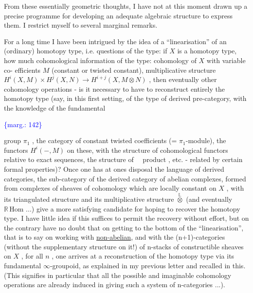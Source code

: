 \documentclass[11pt]{article}
\newcommand{\scanpage}[1]{\par\bigskip\noindent{\small\sffamily[scan #1]}\par}
\newcommand{\mspage}[1]{{\small\sffamily[p.\,#1]}}
\newcommand{\margin}[1]{\textcolor{blue}{\{\textsf{marg.:} #1\}}}
\newcommand{\uline}[1]{\underline{#1}}
\begin{document}
From these essentially geometric thoughts, I have not at
this moment drawn up a precise programme for developing an
adequate algebraic structure to express them.  I restrict myself
to several marginal remarks.

For a long time I  have been intrigued by the idea of a
``linearisation'' of an (ordinary) homotopy type, i.e. questions of
the type: if  $X$  is a homotopy type, how much cohomological
information of the type: cohomology of  $X$  with variable co-%
efficients  $M$ (constant or twisted constant), multiplicative
structure  $H^{i}(X, M) \times H^{j}(X, N) \to H^{i+j}(X, M \otimes N)$ ,  then eventually
other cohomology operations - is it necessary to have to reconstruct
entirely the homotopy type (say, in this first setting, of the
type of derived pre-category, with the knowledge of the fundamental

\margin{142}

\clearpage
\scanpage{134-2/142}
\mspage{- 15 -}

group $\pi_1$ , the category of constant twisted coefficients
(= $\pi_1$-module), the functors $H^i(-, M)$ on these, with the structure
of cohomological functors relative to exact sequences, the
structure of \ \ product , etc. - related by certain formal
properties)? Once one has at ones disposal the language of derived
categories, the sub-category of the derived category of abelian
complexes, formed from complexes of sheaves of cohomology which
are locally constant on $X$ , with its triangulated structure
and its multiplicative structure $\overset{\mathbb{L}}{\otimes}$ (and eventually $\mathbb{R}\,\mathrm{Hom}$ ...)
give a more satisfying candidate for hoping to recover the
homotopy type. I have little idea if this suffices to permit
the recovery without effort, but on the contrary have no doubt
that on getting to the bottom of the ``linearisation'', that is
to say on working with \uline{non-abelian}, and with the (n+1)-categories
(without the supplementary structure on it!) of n-stacks of
constructible sheaves on $X$ , for all $n$ , one arrives at a
reconstruction of the homotopy type via its fundamental $\infty$-groupoid,
as explained in my previous letter and recalled in this. (This
signifies in particular that all the possible and imaginable
cohomology operations are already induced in giving such a system
of n-categories ...).
\end{document}
